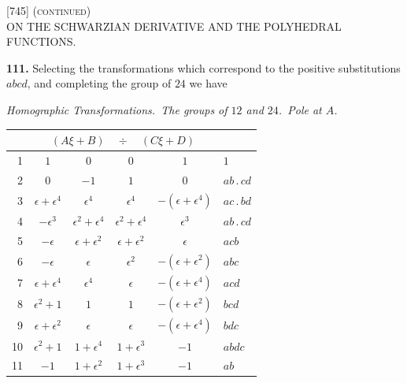 \documentclass[11pt]{article}
\newcommand{\artno}[1]{\textbf{#1.}\quad}
\begin{document}
\begin{center}
\textsc{[745] (continued)}\\[2pt]
\textsc{ON THE SCHWARZIAN DERIVATIVE AND THE POLYHEDRAL FUNCTIONS.}
\end{center}

\bigskip

\noindent
\artno{111} Selecting the transformations which correspond to the positive
substitutions $abcd$, and completing the group of $24$ we have

\medskip
\begin{center}
\textit{Homographic Transformations.\ The groups of $12$ and $24$.\ Pole at $A$.}
\smallskip
\begin{center}
\begin{tabular}{r|cccc|l}
\multicolumn{1}{c}{} & \multicolumn{4}{c}{$(A\xi + B)\quad\div\quad(C\xi + D)$} & \\
\hline
1  & $1$ & $0$ & $0$ & $1$ & $1$\\
2  & $0$ & $-1$ & $1$ & $0$ & $ab\,.\,cd$\\
3  & $\epsilon + \epsilon^{4}$ & $\epsilon^{4}$ & $\epsilon^{4}$
   & $-(\epsilon + \epsilon^{4})$ & $ac\,.\,bd$\\
4  & $-\epsilon^{3}$ & $\epsilon^{2} + \epsilon^{4}$
   & $\epsilon^{2} + \epsilon^{4}$ & $\epsilon^{3}$ & $ab\,.\,cd$\\
5  & $-\epsilon$ & $\epsilon + \epsilon^{2}$
   & $\epsilon + \epsilon^{2}$ & $\epsilon$ & $acb$\\
6  & $-\epsilon$ & $\epsilon$ & $\epsilon^{2}$
   & $-(\epsilon + \epsilon^{2})$ & $abc$\\
7  & $\epsilon + \epsilon^{4}$ & $\epsilon^{4}$ & $\epsilon$
   & $-(\epsilon + \epsilon^{4})$ & $acd$\\
8  & $\epsilon^{2} + 1$ & $1$ & $1$
   & $-(\epsilon + \epsilon^{2})$ & $bcd$\\
9  & $\epsilon + \epsilon^{2}$ & $\epsilon$ & $\epsilon$
   & $-(\epsilon + \epsilon^{4})$ & $bdc$\\
10 & $\epsilon^{2} + 1$ & $1 + \epsilon^{4}$ & $1 + \epsilon^{3}$
   & $-1$ & $abdc$\\
11 & $-1$ & $1 + \epsilon^{2}$ & $1 + \epsilon^{3}$
   & $-1$ & $ab$\\

\end{tabular}
\end{center}
\end{center}
\end{document}
